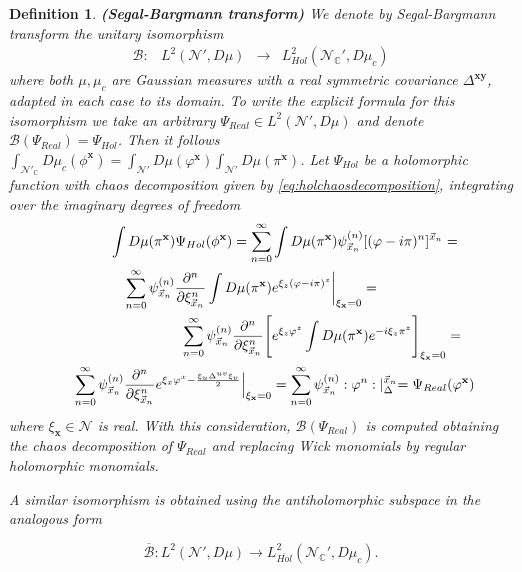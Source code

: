 \documentclass{elsarticle}%
\newtheorem{definition}{Definition}%
\begin{document}
    \begin{definition}
        \label{def:Segaltranf}{\bf (Segal-Bargmann transform)} We denote by Segal-Bargmann transform the unitary isomorphism
        $$
        \begin{array}{cccc}
        \mathcal{B} :&  L^2(\mathcal{N}',D\mu)  & \longrightarrow &  L_{Hol}^2(\mathcal{N}_{\mathbb{C}}',D\mu_c) 
        \end{array}
        $$
        where both $\mu,\mu_c$ are Gaussian measures with a real symmetric covariance $\Delta^{\mathbf{xy}}$, adapted in each case to its domain. To write the explicit formula for this isomorphism we take an arbitrary $\Psi_{Real}\in L^2(\mathcal{N}',D\mu)$ and denote $\mathcal{B}(\Psi_{Real})=\Psi_{Hol}$. Then it follows   $\int_{\mathcal{N}'_\mathbb{C}} D\mu_c(\phi^{\mathbf{x}})=\int_{\mathcal{N}'} D\mu(\varphi^{\mathbf{x}})\int_{\mathcal{N}'} D\mu(\pi^{\mathbf{x}})$. Let $\Psi_{Hol}$ be a holomorphic function with chaos decomposition given by \eqref{eq:holchaosdecomposition}, integrating over the imaginary degrees of freedom 
    \begin{equation*}
        \label{eq:schHolrelation}
        \begin{split}
        \int D\mu(\pi^{\mathbf{x}})\Psi_{Hol}(\phi^\mathbf{x})=
        \sum_{n=0}^\infty &\int D\mu(\pi^{\mathbf{x}}) \psi^{(n)}_{\vec{x}_n}{[(\varphi-%
        i\pi)^n]^{\vec{x}_n}}=
        \\
        \sum_{n=0}^\infty  \psi^{(n)}_{\vec{x}_n}\frac{\partial^n}{\partial \xi^n_{\vec{x}_n}}\int D\mu(\pi^{\mathbf{x}})& e^{\xi_z(\varphi-i\pi)^z}\bigg\lvert_{\xi_{\mathbf{x}}=0}= 
        \\
        \sum_{n=0}^\infty  \psi^{(n)}_{\vec{x}_n}
        \frac{\partial^n}{\partial \xi^n_{\vec{x}_n}}\Bigg[&   e^{{\xi_z\varphi^z} } \int D\mu(\pi^{\mathbf{x}}) e^{-i{\xi_z\pi^z}}\Bigg]_{\xi_{\mathbf{x}}=0}= 
        \\
        \hspace{ 2 em}\sum_{n=0}^\infty \psi^{(n)}_{\vec{x}_n}\frac{\partial^n}{\partial \xi^n_{\vec{x}_n}}e^{\xi_x\varphi^x-\frac{\xi_u\Delta^{uv}\xi_v}{2}}\Big\lvert_{\xi_\mathbf{x}=0}&=
        \sum_{n=0}^\infty \psi^{(n)}_{\vec{x}_n}:\varphi^n:\lvert_{{\Delta}}^{\vec{x}_n}=
         \Psi_{Real}(\varphi^{\mathbf{x}})
        \end{split}
    \end{equation*}
    where $\xi_\mathbf{x}\in \mathcal{N}$ is real.   With this consideration,  $\mathcal{B}(\Psi_{Real})$ is computed obtaining the chaos decomposition of  $\Psi_{Real}$ and replacing Wick monomials by regular holomorphic monomials. 
    
    A similar isomorphism is obtained using the antiholomorphic subspace in the analogous form
    
    $$
    \overline{\mathcal{B}} :L^2(\mathcal{N}',D\mu)   \longrightarrow  L_{\overline{Hol}}^2(\mathcal{N}_{\mathbb{C}}',D\mu_c).
    $$
\end{definition}
\end{document}
